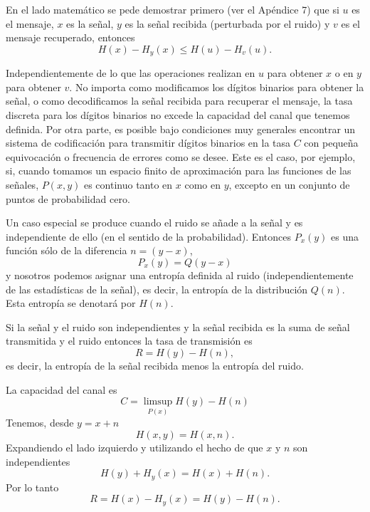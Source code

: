 En el lado matem\'atico se pede demostrar primero (ver el Ap\'endice
7) que si $u$ es el mensaje, $x$ es la se\~nal, $y$ es la se\~nal
recibida (perturbada por el ruido) y $v$ es el mensaje recuperado,
entonces 
\begin{equation} 
H(x) - H_{y}(x) \le H(u) - H_{v}(u).  
\end{equation}
	
Independientemente de lo que las operaciones realizan en $u$ para
obtener $x$ o en $y$ para obtener $v$. No importa como modificamos los
d\'igitos binarios para obtener la se\~nal, o como decodificamos la
se\~nal recibida para recuperar el mensaje, la tasa discreta para los
d\'igitos binarios no excede la capacidad del canal que tenemos
definida. Por otra parte, es posible bajo condiciones muy generales
encontrar un sistema de codificaci\'on para transmitir d\'igitos
binarios en la tasa $C$ con peque\~na equivocaci\'on o frecuencia de
errores como se desee. Este es el caso, por ejemplo, si, cuando
tomamos un espacio finito de aproximaci\'on para las funciones de las
se\~nales, $P(x,y)$ es continuo tanto en $x$ como en $y$, excepto en
un conjunto de puntos de probabilidad cero.
	
Un caso especial se produce cuando el ruido se a\~nade a la se\~nal y
es independiente de ello (en el sentido de la
probabilidad). Entonces $P_{x}(y)$ es una funci\'on s\'olo de
la diferencia $n = (y-x)$, 
\begin{equation} 
P_{x}(y) = Q(y - x)
\end{equation}
y nosotros podemos asignar una entrop\'ia definida al ruido
(independientemente de las estad\'isticas de la se\~nal), es decir, la
entrop\'ia de la distribuci\'on $Q(n)$. Esta entrop\'ia se denotar\'a
por $H(n)$.

\begin{theorem}	
\label{th:16}
Si la se\~nal y el ruido son independientes y la se\~nal recibida es
la suma de se\~nal transmitida y el ruido entonces la tasa de
transmisi\'on es
\begin{equation}
R = H(y) - H(n),
\end{equation}
es decir, la entrop\'ia de la se\~nal recibida menos la entrop\'ia del
ruido.
\end{theorem}

La capacidad del canal es
\begin{equation}
C = \limsup_{P(x)} H(y) - H(n)
\end{equation}
Tenemos, desde $y = x+n$
\begin{equation}
H(x,y) = H(x,n).
\end{equation}
Expandiendo el lado izquierdo y utilizando el hecho de que $x$ y $n$
son independientes
\begin{equation}
H(y) + H_{y}(x) = H(x) + H(n).
\end{equation}
Por lo tanto
\begin{equation}
R = H(x) - H_{y}(x) = H(y) - H(n).
\end{equation}
	
